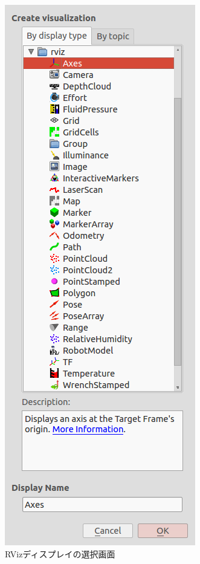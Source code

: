 \begin{figure}[htp]
  \centering
  \includegraphics[width=\columnwidth]{pictures/chapter5/pic_05_06.png}
  \caption{RVizディスプレイの選択画面}
\end{figure}

